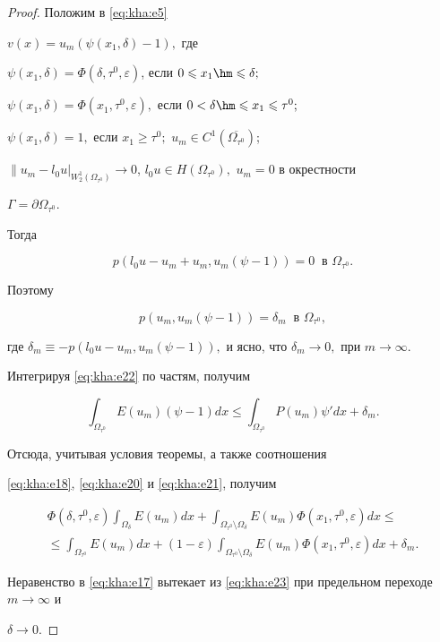 \begin{proof}

Положим в \eqref{eq:kha:e5}

$v(x)=u_m(\psi(x_1,\delta)-1),$ где

$\psi(x_1,\delta)=\Phi(\delta,\tau^0,\varepsilon)$, если $0\leqslant x_1 \hm \leqslant\delta;$

$\psi(x_1,\delta)=\Phi(x_1,\tau^0,\varepsilon),$ если $0<\delta \hm\leqslant x_1\leqslant\tau^0;$ 

$\psi(x_1,\delta)=1,$ если $x_1\geqslant\tau^0;$ $u_m\in C^1(\overline{\Omega_{\tau^0}})$;

$\|u_m-l_0u|_{W_2^1( \Omega_{\tau^0})}\to  0$, $l_0u\in H(\Omega_{\tau^0}),$ $u_m =0$ в окрестности

$\Gamma=\partial\Omega_{\tau^0}.$

Тогда 

$$ p(l_0u-u_m+u_m,u_m(\psi-1))=0 \;\; \text{в $\Omega_{\tau^0}.$}$$ 

Поэтому

\begin{equation}\label{eq:kha:e22}

 p(u_m,u_m(\psi-1))=\delta_m \;\; \text{в  $\Omega_{\tau^0},$}

 \end{equation}

где $\delta_m\equiv -p(l_0u-u_m,u_m(\psi-1)),$ и ясно, что $\delta_m\to  0,$ при $m\to  \infty .$



Интегрируя \eqref{eq:kha:e22} по частям, получим

$$

\int _{\Omega_{\tau^0}}E(u_m)(\psi-1)dx\leqslant\int _{\Omega_{\tau^0}}P(u_m)\psi'

dx+\delta_m.

$$

Отсюда, учитывая условия теоремы,  а также соотношения

\eqref{eq:kha:e18}, \eqref{eq:kha:e20} и \eqref{eq:kha:e21}, получим

\begin{multline}

\label{eq:kha:e23}

\Phi(\delta,\tau^0,\varepsilon)\int _{\Omega_{\delta}}E(u_m)dx+

\int _{\Omega_{\tau^0}\setminus\Omega_{\delta}}E(u_m)\Phi(x_1,\tau^0,\varepsilon)dx\leq

\\

\leq\int _{\Omega_{\tau^0}}E(u_m)dx+(1-\varepsilon)\int _{\Omega_{\tau^0}\setminus\Omega_{\delta}}

E(u_m)\Phi(x_1,\tau^0,\varepsilon)dx+\delta_m.

\end{multline}

Неравенство в \eqref{eq:kha:e17} вытекает из \eqref{eq:kha:e23} при предельном переходе $m\to \infty $ и

$\delta\to 0$.

\end{proof}



